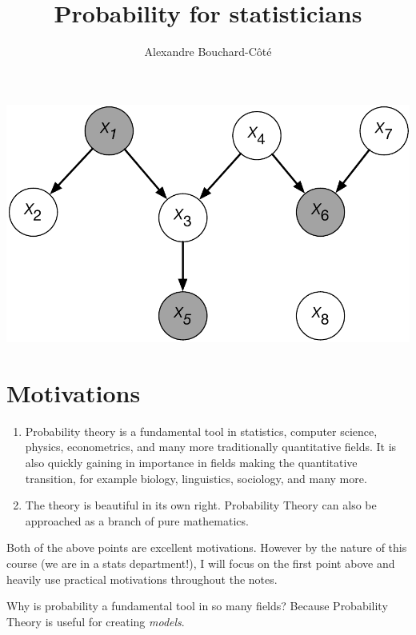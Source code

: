 \documentclass{article}
\title{Probability for statisticians}
\author{Alexandre Bouchard-C\^ot\'e}
\date{}
\begin{document}
\maketitle

\noindent\hrulefill
\vspace{1in}
\includegraphics[width=1.0\linewidth]{figures/graph-model-cond} 

\newpage

\noindent\hrulefill
\tableofcontents
\noindent\hrulefill

\newpage


\section{Motivations}

\begin{enumerate}
	\item Probability theory is a fundamental tool in statistics, computer science, physics, econometrics, and many more traditionally quantitative fields. It is also quickly gaining in importance in fields making the quantitative transition, for example biology, linguistics, sociology, and many more. 
	\item The theory is beautiful in its own right. Probability Theory can also be approached as a branch of pure mathematics. 
\end{enumerate}
 
Both of the above points are excellent motivations. However by the nature of this course (we are in a stats department!), I will focus on the first point above and heavily use practical motivations throughout the notes. 

Why is probability a fundamental tool in so many fields? Because Probability Theory is useful for creating \emph{models}. 
\end{document}
